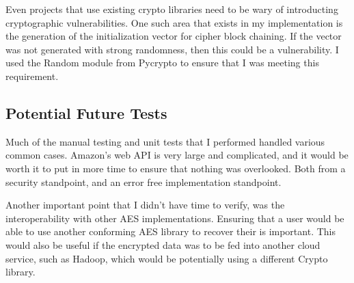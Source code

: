 Even projects that use existing crypto libraries need to be wary of introducting cryptographic vulnerabilities. One such area
that exists in my implementation is the generation of the initialization vector for cipher block chaining. If 
the vector was not generated with strong randomness, then this could be a vulnerability.
I used the Random module from Pycrypto to ensure that I was meeting this requirement.

\subsection{Potential Future Tests}
Much of the manual testing and unit tests that I performed handled various common cases. Amazon's web API is very large and complicated,
and it would be worth it to put in more time to ensure that nothing was overlooked. Both from a security standpoint, and an 
error free implementation standpoint.

Another important point that I didn't have time to verify, was the interoperability with other AES implementations. Ensuring that a user would be able to use another conforming AES library to recover their is important. This would also be useful if the encrypted data was to be fed into another cloud service, such as Hadoop, which would be potentially using a different Crypto library.
